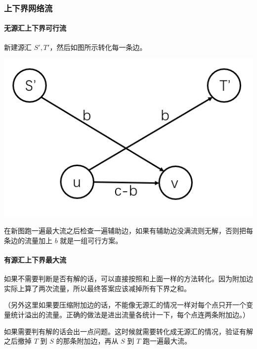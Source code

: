 

\subsubsection{上下界网络流}

\paragraph{无源汇上下界可行流}
新建源汇 $S', T'$，然后如图所示转化每一条边。

\includegraphics[scale = 0.5]{../src/graph/上下界网络流.png}

在新图跑一遍最大流之后检查一遍辅助边，如果有辅助边没满流则无解，否则把每条边的流量加上 $b$ 就是一组可行方案。

\paragraph{有源汇上下界最大流}
如果不需要判断是否有解的话，可以直接按照和上面一样的方法转化。因为附加边实际上算了两次流量，所以最终答案应该减掉所有下界之和。

（另外这里如果要压缩附加边的话，不能像无源汇的情况一样对每个点只开一个变量统计溢出的流量。正确的做法是进出流量各统计一下，每个点连两条附加边。）

如果需要判有解的话会出一点问题。这时候就需要转化成无源汇的情况，验证有解之后撤掉 $T$ 到 $S$ 的那条附加边，再从 $S$ 到 $T$ 跑一遍最大流。

\inputminted{cpp}{../src/graph/有源汇上下界最大流.cpp}

